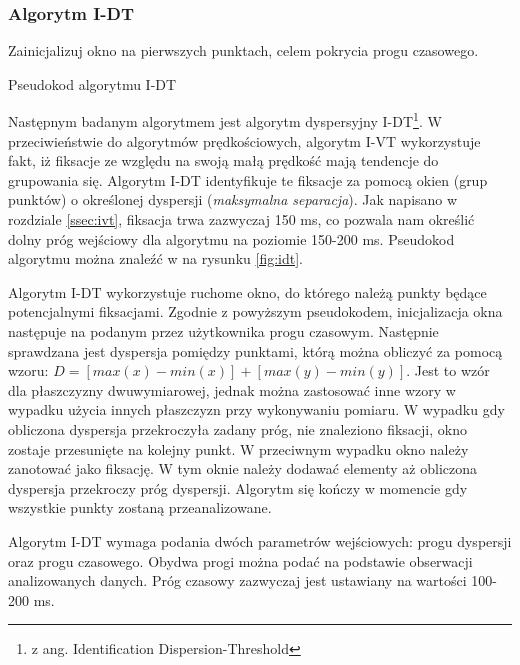 \subsubsection{Algorytm I-DT}
\label{ssec:idt}
{
\begin{algorithm}[H]

    {
        Zainicjalizuj okno na pierwszych punktach, celem pokrycia progu czasowego.\;
    }
    \;
    \caption{Pseudokod algorytmu I-DT}
    \label{fig:idt}
\end{algorithm}}
Następnym badanym algorytmem jest algorytm dyspersyjny I-DT\footnote{z ang. Identification Dispersion-Threshold}. W przeciwieństwie do algorytmów prędkościowych, algorytm I-VT wykorzystuje fakt, iż fiksacje ze względu na swoją małą prędkość mają tendencje do grupowania się. Algorytm I-DT identyfikuje te fiksacje za pomocą okien (grup punktów) o określonej dyspersji (\emph{maksymalna separacja}). Jak napisano w rozdziale \ref{ssec:ivt}, fiksacja trwa zazwyczaj 150 ms, co pozwala nam określić dolny próg wejściowy dla algorytmu na poziomie 150-200 ms. Pseudokod algorytmu można znaleźć w na rysunku \ref{fig:idt}.\par
Algorytm I-DT wykorzystuje ruchome okno, do którego należą punkty będące potencjalnymi fiksacjami. Zgodnie z powyższym pseudokodem, inicjalizacja okna następuje na podanym przez użytkownika progu czasowym. Następnie sprawdzana jest dyspersja pomiędzy punktami, którą można obliczyć za pomocą wzoru: $D = [max(x) - min(x)] + [max(y) - min(y)]$. Jest to wzór dla płaszczyzny dwuwymiarowej, jednak można zastosować inne wzory w wypadku użycia innych płaszczyzn przy wykonywaniu pomiaru. W wypadku gdy obliczona dyspersja przekroczyła zadany próg, nie znaleziono fiksacji, okno zostaje przesunięte na kolejny punkt. W przeciwnym wypadku okno należy zanotować jako fiksację. W tym oknie należy dodawać elementy aż obliczona dyspersja przekroczy próg dyspersji. Algorytm się kończy w momencie gdy wszystkie punkty zostaną przeanalizowane.\par
Algorytm I-DT wymaga podania dwóch parametrów wejściowych: progu dyspersji oraz progu czasowego. Obydwa progi można podać na podstawie obserwacji analizowanych danych. Próg czasowy zazwyczaj jest ustawiany na wartości 100-200 ms.
